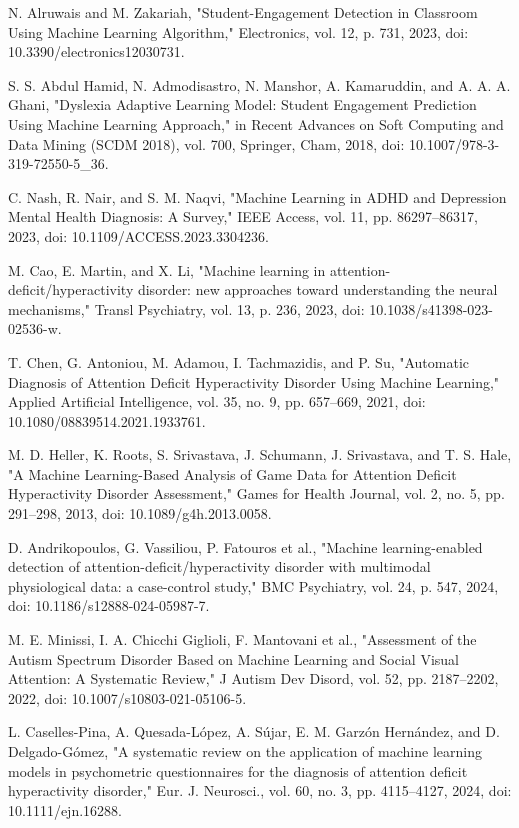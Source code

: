 \documentclass[12pt]{article}
\begin{document}
\begin{thebibliography}{99}
 N. Alruwais and M. Zakariah, "Student-Engagement Detection in Classroom Using Machine Learning Algorithm," Electronics, vol. 12, p. 731, 2023, doi: 10.3390/electronics12030731.

 S. S. Abdul Hamid, N. Admodisastro, N. Manshor, A. Kamaruddin, and A. A. A. Ghani, "Dyslexia Adaptive Learning Model: Student Engagement Prediction Using Machine Learning Approach," in Recent Advances on Soft Computing and Data Mining (SCDM 2018), vol. 700, Springer, Cham, 2018, doi: 10.1007/978-3-319-72550-5\_36.

 C. Nash, R. Nair, and S. M. Naqvi, "Machine Learning in ADHD and Depression Mental Health Diagnosis: A Survey," IEEE Access, vol. 11, pp. 86297–86317, 2023, doi: 10.1109/ACCESS.2023.3304236.

 M. Cao, E. Martin, and X. Li, "Machine learning in attention-deficit/hyperactivity disorder: new approaches toward understanding the neural mechanisms," Transl Psychiatry, vol. 13, p. 236, 2023, doi: 10.1038/s41398-023-02536-w.

 T. Chen, G. Antoniou, M. Adamou, I. Tachmazidis, and P. Su, "Automatic Diagnosis of Attention Deficit Hyperactivity Disorder Using Machine Learning," Applied Artificial Intelligence, vol. 35, no. 9, pp. 657–669, 2021, doi: 10.1080/08839514.2021.1933761.

 M. D. Heller, K. Roots, S. Srivastava, J. Schumann, J. Srivastava, and T. S. Hale, "A Machine Learning-Based Analysis of Game Data for Attention Deficit Hyperactivity Disorder Assessment," Games for Health Journal, vol. 2, no. 5, pp. 291–298, 2013, doi: 10.1089/g4h.2013.0058.

 D. Andrikopoulos, G. Vassiliou, P. Fatouros et al., "Machine learning-enabled detection of attention-deficit/hyperactivity disorder with multimodal physiological data: a case-control study," BMC Psychiatry, vol. 24, p. 547, 2024, doi: 10.1186/s12888-024-05987-7.

 M. E. Minissi, I. A. Chicchi Giglioli, F. Mantovani et al., "Assessment of the Autism Spectrum Disorder Based on Machine Learning and Social Visual Attention: A Systematic Review," J Autism Dev Disord, vol. 52, pp. 2187–2202, 2022, doi: 10.1007/s10803-021-05106-5.

 L. Caselles-Pina, A. Quesada-López, A. Sújar, E. M. Garzón Hernández, and D. Delgado-Gómez, "A systematic review on the application of machine learning models in psychometric questionnaires for the diagnosis of attention deficit hyperactivity disorder," Eur. J. Neurosci., vol. 60, no. 3, pp. 4115–4127, 2024, doi: 10.1111/ejn.16288.


\end{thebibliography}
\end{document}
